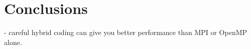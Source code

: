 \section{Conclusions}\label{sec:sga-conclusion}

- careful hybrid coding can give you better performance than MPI or OpenMP alone.